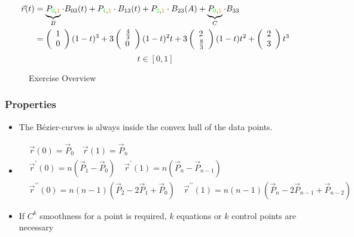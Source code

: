 $$
\begin{aligned}
\vec{r}(t) & =\underbrace{P_{\textcolor{green}{0}, \textcolor{orange}{1}}}_B \cdot B_{03}(t)+P_{\textcolor{green}{1}, \textcolor{orange}{1}} \cdot B_{13}(t)+P_{\textcolor{green}{2}, \textcolor{orange}{1}} \cdot B_{23}(A)+\underbrace{P_{\textcolor{green}{0}, \textcolor{orange}{1}}}_C \cdot B_{33} \\
& =\left(\begin{array}{l}
1 \\
0
\end{array}\right)(1-t)^3+3\left(\begin{array}{l} \frac{4}{3} \\ 0 \end{array}\right)(1-t)^2 t+3\left(\begin{array}{l}
2 \\
\frac{8}{3}
\end{array}\right)(1-t) t^2+\left(\begin{array}{l}
2 \\
3
\end{array}\right) t^3
\end{aligned}
$$
$$
t \in[0,1]
$$
\begin{figure}[ht]
  \centering
  \caption{Exercise Overview}
  \label{fig:bezier}
\end{figure}
\FloatBarrier

\subsubsection{Properties}
\begin{itemize}
    \item The Bézier-curves is always inside the convex hull of the data points.
    \item$$
    \begin{aligned}
    & \vec{r}(0)=\vec{P}_{0} \quad \vec{r}(1)=\vec{P}_{n} \\
    & \vec{r}^{\prime}(0)=n\left(\vec{P}_{1}-\vec{P}_{0}\right) \quad \vec{r}^{\prime}(1)=n\left(\vec{P}_{n}-\vec{P}_{n-1}\right) \\
    & \vec{r}^{\prime \prime}(0)=n(n-1)\left(\vec{P}_{2}-2 \vec{P}_{1}+\vec{P}_{0}\right) \quad \vec{r}^{\prime \prime}(1)=n(n-1)\left(\vec{P}_{n}-2 \vec{P}_{n-1}+\vec{P}_{n-2}\right)
    \end{aligned}
    $$
    \item If $C^{k}$ smoothness for a point is required, $k$ equations or $k$ control points are necessary
\end{itemize}
